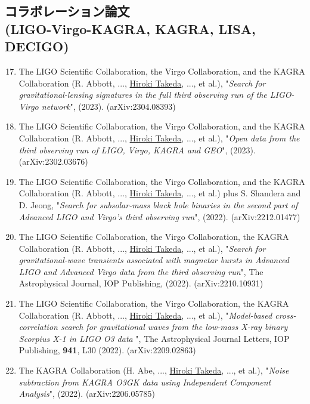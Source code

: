 \documentclass[uplatex, 11pt]{jsarticle}
\begin{document}
\subsection*{コラボレーション論文 \\(LIGO-Virgo-KAGRA, KAGRA, LISA, DECIGO)}
\begin{enumerate}
\setcounter{enumi}{16}
\item The LIGO Scientific Collaboration, the Virgo Collaboration, and the KAGRA Collaboration (R. Abbott, ..., \uline{Hiroki Takeda}, ..., et al.), "\emph{Search for gravitational-lensing signatures in the full third observing run of the LIGO-Virgo network}", (2023). (arXiv:2304.08393)\\

\item The LIGO Scientific Collaboration, the Virgo Collaboration, and the KAGRA Collaboration (R. Abbott, ..., \uline{Hiroki Takeda}, ..., et al.), "\emph{Open data from the third observing run of LIGO, Virgo, KAGRA and GEO}", (2023). (arXiv:2302.03676)\\

\item The LIGO Scientific Collaboration, the Virgo Collaboration, and the KAGRA Collaboration (R. Abbott, ..., \uline{Hiroki Takeda}, ..., et al.) plus S. Shandera and D. Jeong, "\emph{Search for subsolar-mass black hole binaries in the second part of Advanced LIGO and Virgo's third observing run}", (2022). (arXiv:2212.01477)\\

\item The LIGO Scientific Collaboration, the Virgo Collaboration, the KAGRA Collaboration (R. Abbott, ..., \uline{Hiroki Takeda}, ..., et al.), "\emph{Search for gravitational-wave transients associated with magnetar bursts in Advanced LIGO and Advanced Virgo data from the third observing run}", The Astrophysical Journal, IOP Publishing, (2022). (arXiv:2210.10931)\\

\item The LIGO Scientific Collaboration, the Virgo Collaboration, the KAGRA Collaboration (R. Abbott, ..., \uline{Hiroki Takeda}, ..., et al.), "\emph{Model-based cross-correlation search for gravitational waves from the low-mass X-ray binary Scorpius X-1 in LIGO O3 data }", The Astrophysical Journal Letters, IOP Publishing, {\bf 941}, L30 (2022). (arXiv:2209.02863)\\

\item The KAGRA Collaboration (H. Abe, ..., \uline{Hiroki Takeda}, ..., et al.), "\emph{Noise subtraction from KAGRA O3GK data using Independent Component Analysis}", (2022). (arXiv:2206.05785)\\


\end{enumerate}
\end{document}
